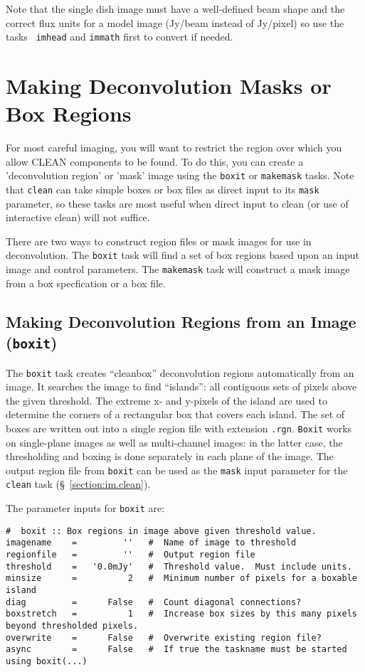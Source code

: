 Note that the single dish image must have a
well-defined beam shape and the correct flux units for a model image
(Jy/beam instead of Jy/pixel) so use the tasks {\tt
imhead} and {\tt immath} first to convert if needed.

\section{Making Deconvolution Masks or Box Regions}
\label{section:im.mask}

For most careful imaging, you will want to restrict the region over
which you allow CLEAN components to be found.  To do this, you can
create a 'deconvolution region' or 'mask' image using the {\tt boxit}
or {\tt makemask} tasks.  Note that {\tt clean} can take simple boxes
or box files as direct input to its {\tt mask} parameter, so these
tasks are most useful when direct input to clean (or use of
interactive clean) will not suffice.

There are two ways to construct region files or mask images for use
in deconvolution.  The {\tt boxit} task will find a set of box regions
based upon an input image and control parameters.  The {\tt makemask}
task will construct a mask image from a box specfication or a box
file.  

\subsection{Making Deconvolution Regions from an Image ({\tt boxit})}
\label{section:im.mask.boxit}

The {\tt boxit} task creates ``cleanbox'' deconvolution regions automatically
from an image.  It searches the image to find ``islands'': all contiguous
sets of pixels above the given threshold.  The extreme x- and y-pixels of the
island are used to determine the corners of a rectangular box that covers each
island.  The set of boxes are written out into a single region file with
extension {\tt .rgn}.  {\tt Boxit} works on single-plane images as well as
multi-channel images: in the latter case, the thresholding and boxing is done
separately in each plane of the image.  The output region file from {\tt boxit}
can be used as the {\tt mask} input parameter for the {\tt clean} task
(\S~\ref{section:im.clean}).

The parameter inputs for {\tt boxit} are:
\small
\begin{verbatim}
#  boxit :: Box regions in image above given threshold value.
imagename    =         ''   #  Name of image to threshold
regionfile   =         ''   #  Output region file
threshold    =   '0.0mJy'   #  Threshold value.  Must include units.
minsize      =          2   #  Minimum number of pixels for a boxable island
diag         =      False   #  Count diagonal connections?
boxstretch   =          1   #  Increase box sizes by this many pixels beyond thresholded pixels.
overwrite    =      False   #  Overwrite existing region file?
async        =      False   #  If true the taskname must be started using boxit(...)
\end{verbatim}
\normalsize 

